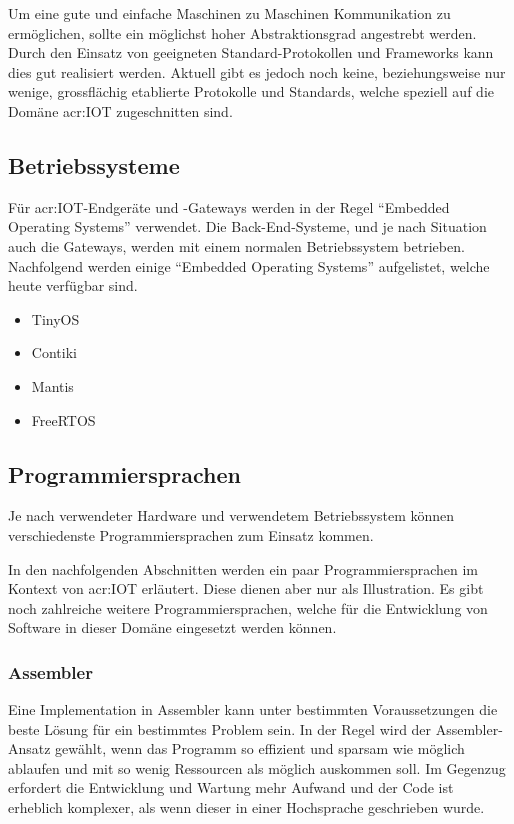 Um eine gute und einfache Maschinen zu Maschinen Kommunikation zu ermöglichen, sollte ein möglichst hoher Abstraktionsgrad angestrebt werden. Durch den Einsatz von geeigneten Standard-Protokollen und Frameworks kann dies gut realisiert werden. Aktuell gibt es jedoch noch keine, beziehungsweise nur wenige, grossflächig etablierte Protokolle und Standards, welche speziell auf die Domäne \gls{acr:IOT} zugeschnitten sind. 

\subsection{Betriebssysteme}
Für \gls{acr:IOT}-Endgeräte und -Gateways werden in der Regel "`Embedded Operating Systems"' verwendet. Die Back-End-Systeme, und je nach Situation auch die Gateways, werden mit einem normalen Betriebssystem betrieben. Nachfolgend werden einige "`Embedded Operating Systems"' aufgelistet, welche heute verfügbar sind.

\begin{itemize}
\item TinyOS
\item Contiki
\item Mantis
\item FreeRTOS
\end{itemize}

\subsection{Programmiersprachen}
Je nach verwendeter Hardware und verwendetem Betriebssystem können verschiedenste Programmiersprachen zum Einsatz kommen.

In den nachfolgenden Abschnitten werden ein paar Programmiersprachen im Kontext von \gls{acr:IOT} erläutert. Diese dienen aber nur als Illustration. Es gibt noch zahlreiche weitere Programmiersprachen, welche für die Entwicklung von Software in dieser Domäne eingesetzt werden können.

\subsubsection{Assembler}
Eine Implementation in Assembler kann unter bestimmten Voraussetzungen die beste Lösung für ein bestimmtes Problem sein. In der Regel wird der Assembler-Ansatz gewählt, wenn das Programm so effizient und sparsam wie möglich ablaufen und mit so wenig Ressourcen als möglich auskommen soll. Im Gegenzug erfordert die Entwicklung und Wartung mehr Aufwand und der Code ist erheblich komplexer, als wenn dieser in einer Hochsprache geschrieben wurde.


